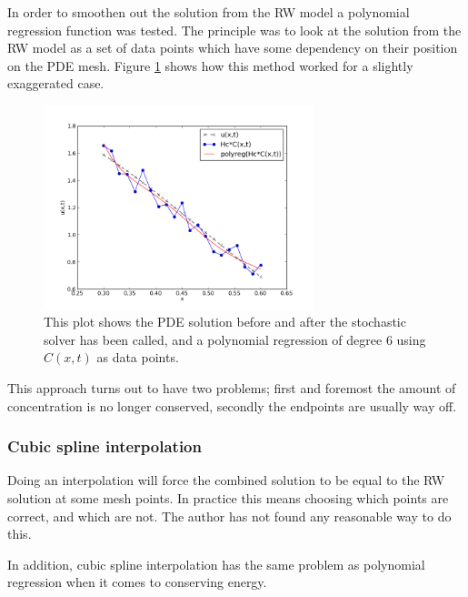  In order to smoothen out the solution from the RW model a polynomial regression function was tested. 
 The principle was to look at the solution from the RW model as a set of data points which have some dependency on their position on the PDE mesh. 
 Figure \ref{theory:polyreg} shows how this method worked for a slightly exaggerated case. 
 \begin{figure}[h]
 \centering
 \includegraphics[width=0.7\textwidth]{Figures/polyreg.png}
 \caption[Combination by polynomial regression]{This plot shows the PDE solution before and after the stochastic solver has been called, and a polynomial regression of degree 6 using $C(x,t)$ as data points. }
 \label{theory:polyreg}
 \end{figure}
 This approach turns out to have two problems; first and foremost the amount of concentration is no longer conserved, secondly the endpoints are usually way off.
 
 \subsubsection{Cubic spline interpolation}
 Doing an interpolation will force the combined solution to be equal to the RW solution at some mesh points. In practice this means choosing which points are correct, and which are not. The author has not found any reasonable way to do this. 
 
 In addition, cubic spline interpolation has the same problem as polynomial regression when it comes to conserving energy.
